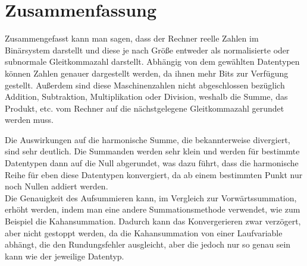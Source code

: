 \documentclass{scrartcl}
\begin{document}
\section{Zusammenfassung}
Zusammengefasst kann man sagen, dass der Rechner reelle Zahlen im Binärsystem darstellt und diese je nach Größe entweder als normalisierte oder subnormale Gleitkommazahl 
darstellt. Abhängig von dem gewählten Datentypen können Zahlen genauer dargestellt werden, da ihnen mehr Bits zur Verfügung gestellt. Außerdem sind diese Maschinenzahlen
nicht abgeschlossen bezüglich Addition, Subtraktion, Multiplikation oder Division, weshalb die Summe, das Produkt, etc. vom Rechner auf die nächstgelegene Gleitkommazahl 
gerundet werden muss.
\begin{flushleft}
Die Auswirkungen auf die harmonische Summe, die bekannterweise divergiert, sind sehr deutlich.
Die Summanden werden sehr klein und werden für bestimmte Datentypen dann auf die Null abgerundet, was dazu führt, dass die harmonische Reihe für eben diese Datentypen konvergiert,
da ab einem bestimmten Punkt nur noch Nullen addiert werden. \\
Die Genauigkeit des Aufsummieren kann, im Vergleich zur Vorwärtssummation, erhöht werden, indem man eine andere 
Summationsmethode verwendet, wie zum Beispiel die Kahansummation. Dadurch kann das Konvergerieren zwar verzögert, aber nicht gestoppt werden, da die Kahansummation von
einer Laufvariable abhängt, die den Rundungsfehler ausgleicht, aber die jedoch nur so genau sein kann wie der jeweilige Datentyp.
\end{flushleft}
\end{document}
